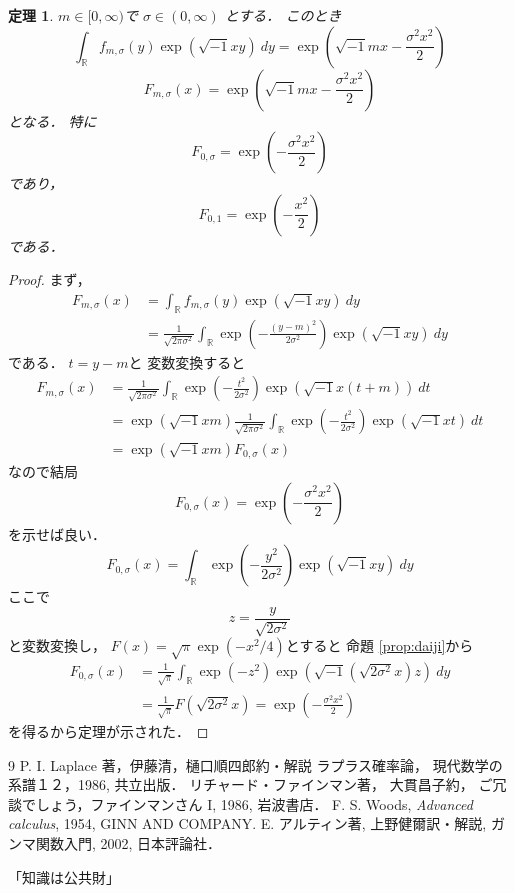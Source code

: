 \documentclass[leqno, 12pt]{jsarticle}
\newtheorem{thm}{定理}
\newcommand{\rr}{\mathbb{R}}
\begin{document}
\begin{thm}
$m\in [0, \infty)$で
$\sigma\in (0, \infty)$
とする．
このとき
\[
\int_{\rr}f_{m, \sigma}(y)\exp(\sqrt{-1}xy)\ dy
=
\exp\left(\sqrt{-1}mx-\frac{\sigma^2x^2}{2}\right)
\]
\[
F_{m, \sigma}(x)=\exp\left(\sqrt{-1}mx-\frac{\sigma^2x^2}{2}\right)
\]
となる．
特に
\[
F_{0, \sigma}=\exp\left(-\frac{\sigma^2x^2}{2}\right)
\]
であり，
\[
F_{0, 1}=\exp\left(-\frac{x^2}{2}\right)
\]
である．
\end{thm}
\begin{proof}
まず，
\begin{align*}
F_{m, \sigma}(x)
&=
\int_{\rr}f_{m, \sigma}(y)\exp(\sqrt{-1}xy)\ dy\\
&=
\frac{1}{\sqrt{2\pi\sigma^2}}
\int_{\rr}\exp\left(-\frac{(y-m)^2}{2\sigma^2}\right)
\exp(\sqrt{-1}xy)\ dy
\end{align*}
である．
$t=y-m$と
変数変換すると
\begin{align*}
F_{m, \sigma}(x)
&=
\frac{1}{\sqrt{2\pi\sigma^2}}
\int_{\rr}\exp\left(-\frac{t^2}{2\sigma^2}\right)
\exp(\sqrt{-1}x(t+m))\ dt
\\
&=
\exp\left(\sqrt{-1}xm\right)
\frac{1}{\sqrt{2\pi\sigma^2}}
\int_{\rr}\exp\left(-\frac{t^2}{2\sigma^2}\right)
\exp(\sqrt{-1}xt)\ dt\\
&=
\exp\left(\sqrt{-1}xm\right)
F_{0, \sigma}(x)
\end{align*}
なので結局
\[
F_{0, \sigma}(x)=\exp\left(-\frac{\sigma^2x^2}{2}\right)
\]
を示せば良い．
\[
F_{0, \sigma}(x)=
\int_{\rr}\exp\left(-\frac{y^2}{2\sigma^2}\right)
\exp(\sqrt{-1}xy)\ dy
\]
ここで
\[
z=\frac{y}{\sqrt{2\sigma^2}}
\]
と変数変換し，
$F(x)=\sqrt{\pi}\exp(-x^2/4)$とすると
命題 \ref{prop:daiji}から
\begin{align*}
F_{0, \sigma}(x)
&=
\frac{1}{\sqrt{\pi}}
\int_{\rr}\exp\left(-z^2\right)
\exp(\sqrt{-1}(\sqrt{2\sigma^2}x)z)\ dy\\
&=
\frac{1}{\sqrt{\pi}}F(\sqrt{2\sigma^2}x)
=
\exp\left(-\frac{\sigma^2x^2}{2}\right)
\end{align*}
を得るから定理が示された．
\end{proof}








\begin{thebibliography}{9}
P. I. Laplace 著，伊藤清，樋口順四郎約・解説
ラプラス確率論，
現代数学の系譜１２，1986, 共立出版．
リチャード・ファインマン著，
大貫昌子約，
ご冗談でしょう，ファインマンさん I, 
1986, 岩波書店．
F. S. Woods, 
\textit{Advanced calculus}, 
1954, GINN AND COMPANY. 
E. アルティン著, 上野健爾訳・解説, 
ガンマ関数入門, 
2002, 
日本評論社．
\end{thebibliography}

「知識は公共財」


			
\end{document}
